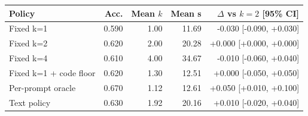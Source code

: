 \begin{tabular}{lrrrr}
\toprule
Policy & Acc. & Mean $k$ & Mean s & $\Delta$ vs $k{=}2$ [95\% CI] \\
\midrule
Fixed k=1 & 0.590 & 1.00 & 11.69 & -0.030 [-0.090, +0.030] \\
Fixed k=2 & 0.620 & 2.00 & 20.28 & +0.000 [+0.000, +0.000] \\
Fixed k=4 & 0.610 & 4.00 & 34.67 & -0.010 [-0.060, +0.040] \\
Fixed k=1 + code floor & 0.620 & 1.30 & 12.51 & +0.000 [-0.050, +0.050] \\
Per-prompt oracle & 0.670 & 1.12 & 12.61 & +0.050 [+0.010, +0.100] \\
Text policy & 0.630 & 1.92 & 20.16 & +0.010 [-0.020, +0.040] \\
\bottomrule
\end{tabular}
